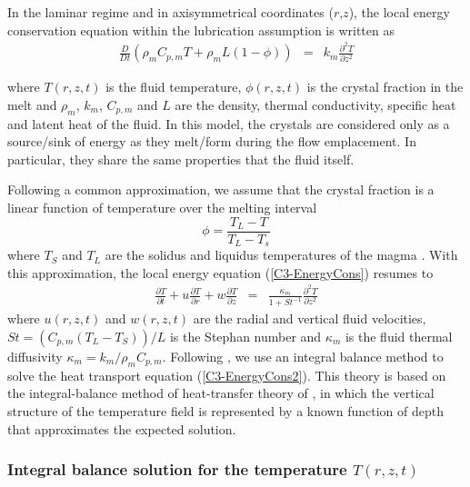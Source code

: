 In the laminar regime and in axisymmetrical coordinates ($r$,$z$), the
local energy  conservation equation within the  lubrication assumption
is written as
\begin{eqnarray}
  \frac{D}{D t}\left(\rho_m C_{p,m} T+\rho_mL(1-\phi)\right)&=& k_m  \frac{\partial^2
                                                                T}{\partial
                                                                z^2}
\label{C3-EnergyCons}
\end{eqnarray}

where  $T(r,z,t)$  is  the  fluid temperature,  $\phi(r,z,t)$  is  the
crystal fraction  in the melt  and $\rho_m$, $k_m$, $C_{p,m}$  and $L$
are the density,  thermal conductivity, specific heat  and latent heat
of the  fluid.  In this model,  the crystals are considered  only as a
source/sink of energy  as they melt/form during  the flow emplacement.
In particular, they share the same properties that the fluid itself.

Following a common approximation, we  assume that the crystal fraction
is a linear function of temperature over the melting interval
\begin{equation}
  \phi = \frac{T_L-T}{T_L-T_s}
  \label{C3-meltfraction}
\end{equation}
where $T_S$ and $T_L$ are the solidus and liquidus temperatures of the
magma  \citep{Hort:1997hk,Michaut:2006di}.   With this  approximation,
the local energy equation (\ref{C3-EnergyCons}) resumes to
\begin{eqnarray}
  \frac{\partial T}{\partial t}+ u\frac{\partial T}{\partial r}
  + w\frac{\partial T}{\partial z}  &=& \frac{ \kappa_m}{1+St^{-1}}  \frac{\partial^2
                                        T}{\partial               z^2}
                                        \label{C3-EnergyCons2}
\end{eqnarray}
where  $u(r,z,t)$ and  $w(r,z,t)$ are  the radial  and vertical  fluid
velocities,  $St  =\left(C_{p,m}(T_L-T_S)\right)/L$   is  the  Stephan
number   and    $\kappa_m$   is   the   fluid    thermal   diffusivity
$\kappa_m = k_m/\rho_m  C_{p,m}$.  Following \citet{BALMFORTH:2004fm},
we use an integral balance method to solve the heat transport equation
(\ref{C3-EnergyCons2}).   This theory  is based  on the  integral-balance
method of heat-transfer theory of \citet{Goodman:1958ue}, in which the
vertical structure of the temperature  field is represented by a known
function of depth that approximates the expected solution.

\subsubsection{Integral   balance   solution   for   the   temperature
  $T(r,z,t)$}

